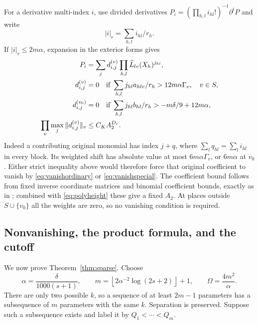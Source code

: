 \documentclass[11pt]{article}
\numberwithin{equation}{section}
\theoremstyle{remark}\newtheorem{remark}[theorem]{Remark}
\begin{document}
For a derivative multi-index $i$, use divided derivatives
$P_i=(\prod_{h,l}i_{hl}!)^{-1}\partial^iP$ and write
\[
 |i|_r=\sum_{h,l}i_{hl}/r_h.
\]
If $|i|_r\le2m\alpha$, expansion in the exterior forms gives
\begin{align}
 P_i&=\sum_jd^{(v)}_{i,j}\prod_{h,l}\widehat L_{lv}(X_h)^{j_{hl}},
       \label{eq:derivativeexp}\\
 d^{(v)}_{i,j}&=0\quad\text{if }\sum_{h,l}j_{hl}a_{hlv}/r_h>12m\alpha\Gamma_v,
       \quad v\in S,\label{eq:derivativeordinary}\\
 d^{(v_0)}_{i,j}&=0\quad\text{if }\sum_{h,l}j_{hl}b_{hl}/r_h>
                  -m\delta/9+12m\alpha,\label{eq:derivativespecial}\\
 \prod_v\max_j\|d^{(v)}_{i,j}\|_v&\le C_K A_2^{D_r}.
       \label{eq:derivativeheight}
\end{align}
Indeed a contributing original monomial has index $j+q$, where
$\sum_lq_{hl}=\sum_li_{hl}$ in every block. Its weighted shift has
absolute value at most $6m\alpha\Gamma_v$, or $6m\alpha$ at $v_0$.
Either strict inequality above would therefore force that original
coefficient to vanish by \eqref{eq:vanishordinary} or
\eqref{eq:vanishspecial}. The coefficient bound follows from fixed
inverse coordinate matrices and binomial coefficient bounds, exactly
as in \cite[Lemma~13.4]{EF13}; combined with \eqref{eq:polyheight} these
give a fixed $A_2$. At places outside $S\cup\{v_0\}$ all the weights
are zero, so no vanishing condition is required.

\subsection{Nonvanishing, the product formula, and the cutoff}
We now prove Theorem~\ref{thm:sparse}. Choose
\begin{equation}\label{eq:parameters}
 \alpha=\frac{\delta}{1000(s+1)},\qquad
 m=\left\lfloor2\alpha^{-2}\log(2s+2)\right\rfloor+1,
 \qquad \Omega=\frac{4m^2}{\alpha}.
\end{equation}
There are only two possible $k$, so a sequence of at least $2m-1$
parameters has a subsequence of $m$ parameters with the same $k$.
Separation is preserved. Suppose such a subsequence exists and label
it by $Q_1<\cdots<Q_m$.
\end{document}
